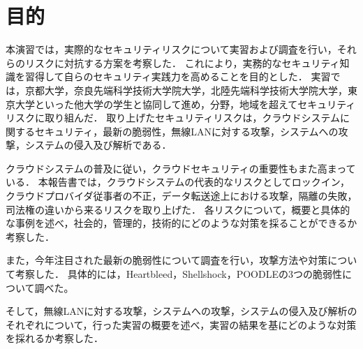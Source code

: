 \section{目的}
本演習では，実際的なセキュリティリスクについて実習および調査を行い，それらのリスクに対抗する方案を考察した．
これにより，実務的なセキュリティ知識を習得して自らのセキュリティ実践力を高めることを目的とした．
実習では，京都大学，奈良先端科学技術大学院大学，北陸先端科学技術大学院大学，東京大学といった他大学の学生と協同して進め，分野，地域を超えてセキュリティリスクに取り組んだ．
取り上げたセキュリティリスクは，クラウドシステムに関するセキュリティ，最新の脆弱性，無線LANに対する攻撃，システムへの攻撃，システムの侵入及び解析である．

クラウドシステムの普及に従い，クラウドセキュリティの重要性もまた高まっている．
本報告書では，クラウドシステムの代表的なリスクとしてロックイン，クラウドプロバイダ従事者の不正，データ転送途上における攻撃，隔離の失敗，司法権の違いから来るリスクを取り上げた．
各リスクについて，概要と具体的な事例を述べ，社会的，管理的，技術的にどのような対策を採ることができるか考察した．

また，今年注目された最新の脆弱性について調査を行い，攻撃方法や対策について考察した．
具体的には，Heartbleed，Shellshock，POODLEの3つの脆弱性について調べた。

そして，無線LANに対する攻撃，システムへの攻撃，システムの侵入及び解析のそれぞれについて，行った実習の概要を述べ，実習の結果を基にどのような対策を採れるか考察した．
